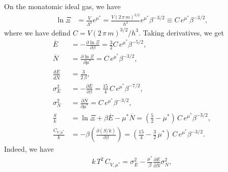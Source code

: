 \documentclass[twocolumn, 10pt]{article}
\numberwithin{equation}{section}
\newenvironment{solution}[1][\empty]
{\par\medskip\sffamily
  \textbf{\ifx\empty#1{Solution.}\relax\else{#1}\fi} \ignorespaces}
{\medskip}
\begin{document}
\begin{solution}
On the monatomic ideal gas, we have
\begin{align*}
  \ln \Xi
  &= \frac{ V } { \Lambda^3 } e^{\mu^*}
  = \frac{ V (2 \, \pi \, m)^{3/2}} { h^3 } e^{\mu^*} \beta^{-3/2}
  \equiv C \, e^{\mu^*} \beta^{-3/2}
  ,
\end{align*}
where we have defind $C = V (2 \, \pi \, m)^{3/2}/h^3$.
%
Taking derivatives, we get
\begin{align*}
  \overline{ E }
  &= - \frac{ \partial \ln \Xi } { \partial \beta }
  = \frac{3}{2} C \, e^{\mu^*} \beta^{-5/2}
  ,
  \\
  \overline{ N }
  &= \frac{ \partial \ln \Xi } { \partial \mu^* }
  = C \, e^{\mu^*} \beta^{-3/2}
  ,
  \\
  \frac{ d\overline E } { d\overline N}
  &=
  \frac{3}{2\,\beta}
  ,
  \\
  \sigma_E^2
  &= - \frac{ \partial \overline{E} } { \partial \beta }
  = \frac{15}{4} \, C \, e^{\mu^*} \beta^{-7/2}
  ,
  \\
  \sigma_N^2
  &= \frac{ \partial \overline{N} } { \partial \mu^* }
  = C \, e^{\mu^*} \beta^{-3/2}
  ,
  \\
  \frac{S}{k}
  &=
  \ln \Xi + \beta \overline{E}
  -\mu^* \overline{N}
  =
  \left(\frac{5}{2} - \mu^* \right) \, C \, e^{\mu^*} \beta^{-3/2}
  ,
  \\
  \frac{C_{V, \mu^*}}{k}
  &= -\beta \left( \frac{\partial (S/k) } {\partial \beta} \right)
  = \left(\frac{15}{4} - \frac{3}{2} \, \mu^* \right)
    \, C \, e^{\mu^*} \beta^{-3/2}
  .
\end{align*}
Indeed, we have
\begin{align}
  k \, T^2 \, C_{V, \mu^*}
  =
  \sigma_E^2
  - \frac{\mu^*}{\beta} \frac{ \partial \overline E } { \partial \overline N} \sigma_N^2
  ,
\end{align}
\end{solution}
\end{document}
